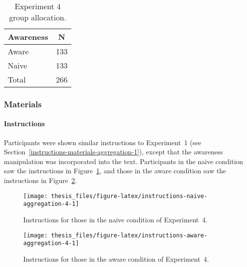\documentclass[a4paper, nobind]{templates/ociamthesis}
\theoremstyle{definition}
\theoremstyle{definition}
\theoremstyle{definition}
\theoremstyle{definition}
\theoremstyle{remark}
\begin{document}
\begin{table}[tbp]

\begin{center}
\begin{threeparttable}

\caption{\label{tab:condition-allocation-aggregation-4}Experiment 4 group allocation.}

\begin{tabular}{ll}
\toprule
Awareness & \multicolumn{1}{c}{N}\\
\midrule
Aware & 133\\
Naive & 133\\
Total & 266\\
\bottomrule
\end{tabular}

\end{threeparttable}
\end{center}

\end{table}

\subsubsection{Materials}

\paragraph{Instructions}

Participants were shown similar instructions to Experiment~1 (see
Section~\ref{instructions-materials-aggregation-1}), except that the awareness
manipulation was incorporated into the text. Participants in the naive condition
saw the instructions in Figure~\ref{fig:instructions-naive-aggregation-4}, and
those in the aware condition saw the instructions in
Figure~\ref{fig:instructions-aware-aggregation-4}.



\begin{figure}
\texttt{[image: thesis\_files/figure-latex/instructions-naive-aggregation-4-1]} \caption{Instructions for those in the naive condition of Experiment~4.}\label{fig:instructions-naive-aggregation-4}
\end{figure}



\begin{figure}
\texttt{[image: thesis\_files/figure-latex/instructions-aware-aggregation-4-1]} \caption{Instructions for those in the aware condition of Experiment~4.}\label{fig:instructions-aware-aggregation-4}
\end{figure}
\end{document}

